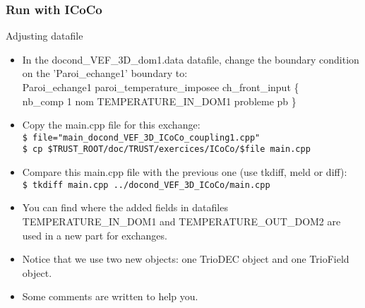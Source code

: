 \documentclass[10pt, hyperref={unicode=true,pdfusetitle, bookmarks=true,bookmarksnumbered=false,bookmarksopen=false, breaklinks=false,pdfborder={0 0 1},backref=true,colorlinks=true,linkcolor=darkblue,pageanchor, urlcolor=darkblue}]{beamer}
\begin{document}
\begin{frame}
\frametitle{Run with ICoCo}

\begin{block}{Adjusting datafile}
\begin{itemize}
\item In the docond\_VEF\_3D\_dom1.data datafile, change the boundary condition on the 'Paroi\_echange1' boundary to:\\
Paroi\_echange1 paroi\_temperature\_imposee ch\_front\_input \{ \\ nb\_comp 1 nom TEMPERATURE\_IN\_DOM1 probleme pb \}
\item Copy the main.cpp file for this exchange:\\
\texttt{\$ file="main\_docond\_VEF\_3D\_ICoCo\_coupling1.cpp"} \\
\texttt{\$ cp \$TRUST\_ROOT/doc/TRUST/exercices/ICoCo/\$file main.cpp }
\item Compare this main.cpp file with the previous one (use tkdiff, meld or diff):\\
\texttt{\$ tkdiff main.cpp ../docond\_VEF\_3D\_ICoCo/main.cpp }
\item You can find where the added fields in datafiles TEMPERATURE\_IN\_DOM1 and TEMPERATURE\_OUT\_DOM2 are used in a new part for exchanges.
\item Notice that we use two new objects: one TrioDEC object and one TrioField object.
\item Some comments are written to help you.
\end{itemize}
\end{block}

\end{frame}
\end{document}

